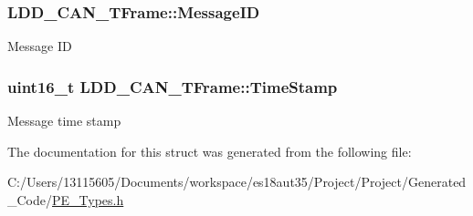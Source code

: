 \subsubsection[{Message\+I\+D}]{ L\+D\+D\+\_\+\+C\+A\+N\+\_\+\+T\+Frame\+::\+Message\+I\+D}\label{struct_l_d_d___c_a_n___t_frame_ab6f347f42b51e9ae318e04cdce84c82c}
Message I\+D \hypertarget{struct_l_d_d___c_a_n___t_frame_a9bab04fefdcfc101f718355bc6e20eb4}{}
\subsubsection[{Time\+Stamp}]{\setlength{\rightskip}{0pt plus 5cm}uint16\+\_\+t L\+D\+D\+\_\+\+C\+A\+N\+\_\+\+T\+Frame\+::\+Time\+Stamp}\label{struct_l_d_d___c_a_n___t_frame_a9bab04fefdcfc101f718355bc6e20eb4}
Message time stamp 

The documentation for this struct was generated from the following file\+:\begin{DoxyCompactItemize}
\item 
C\+:/\+Users/13115605/\+Documents/workspace/es18aut35/\+Project/\+Project/\+Generated\+\_\+\+Code/\hyperlink{_p_e___types_8h}{P\+E\+\_\+\+Types.\+h}\end{DoxyCompactItemize}
